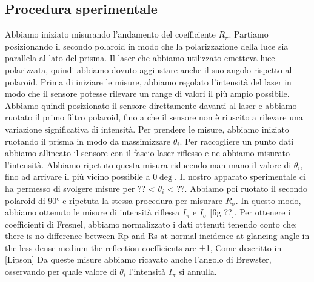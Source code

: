 \subsection{Procedura sperimentale}\label{subsec:procedura-sperimentale}
  Abbiamo iniziato misurando l’andamento del coefficiente $R_\pi$. Partiamo posizionando il secondo polaroid in modo che la polarizzazione della luce sia parallela al lato del prisma. Il laser che abbiamo utilizzato emetteva luce polarizzata, quindi abbiamo dovuto aggiustare anche il suo angolo rispetto al polaroid. Prima di iniziare le misure, abbiamo regolato l’intensità del laser in modo che il sensore potesse rilevare un range di valori il più ampio possibile. Abbiamo quindi posizionato il sensore direttamente davanti al laser e abbiamo ruotato il primo filtro polaroid, fino a che il sensore non è riuscito a rilevare una variazione significativa di intensità.
  Per prendere le misure, abbiamo iniziato ruotando il prisma in modo da massimizzare $\theta_i$. Per raccogliere un
  punto dati abbiamo allineato il sensore con il fascio laser riflesso e ne abbiamo misurato l’intensità. Abbiamo
  ripetuto questa misura riducendo man mano il valore di $\theta_i$, fino ad arrivare il più vicino possibile a $0\deg$.
  Il nostro apparato sperimentale ci ha permesso di svolgere misure per ?? < $\theta_i$ < ??.
  Abbiamo poi ruotato il secondo polaroid di 90° e ripetuta la stessa procedura per misurare $R_\sigma$.
  In questo modo, abbiamo ottenuto le misure di intensità riflessa $I_\pi$ e $I_\sigma$ [fig ??]. Per ottenere i
  coefficienti di Fresnel, abbiamo normalizzato i dati ottenuti tenendo conto che:
  there is no difference between Rp and Rs at normal incidence
  at glancing angle in the less-dense medium the reflection coefficients are ±1,
  Come descritto in [Lipson]
  Da queste misure abbiamo ricavato anche l’angolo di Brewster, osservando per quale valore di $\theta_i$
  l’intensità $I_\pi$ si annulla.
\endinput
